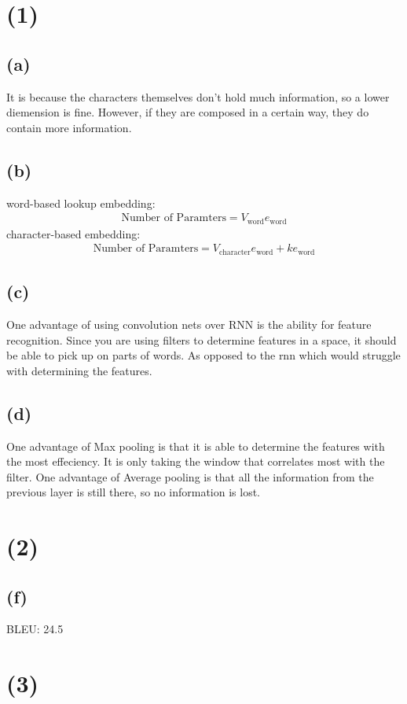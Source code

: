 \documentclass{article}
\begin{document}
\section*{(1)}
\subsection*{(a)}
It is because the characters themselves don't hold much information, so a lower diemension is fine. However, if they are composed in a certain way, they do contain more information.
\subsection*{(b)}
word-based lookup embedding:
\begin{align*}
\text{Number of Paramters} = V_\text{word}e_\text{word}
\end{align*}
character-based embedding:
\begin{align*}
\text{Number of Paramters} = V_\text{character}e_\text{word}+ke_\text{word}
\end{align*}
\subsection*{(c)}
One advantage of using convolution nets over RNN is the ability for feature recognition. Since you are using filters to determine features in a space, it should be able to pick up on parts of words. As opposed to the rnn which would struggle with determining the features.
\subsection*{(d)}
One advantage of Max pooling is that it is able to determine the features with the most effeciency. It is only taking the window that correlates most with the filter. One advantage of Average pooling is that all the information from the previous layer is still there, so no information is lost.

\section*{(2)}
\subsection{(f)}
BLEU: 24.5

\section*{(3)}
\end{document}
